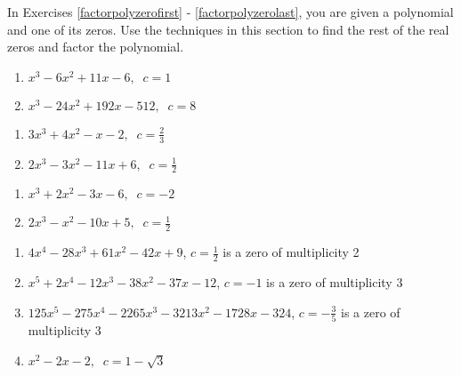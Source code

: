 \newpage

In Exercises \ref{factorpolyzerofirst} - \ref{factorpolyzerolast}, you are given a polynomial and one of its zeros.  Use the techniques in this section to find the rest of the real zeros and factor the polynomial.  

\begin{multicols}{2}
\begin{enumerate}
\setcounter{enumi}{\value{HW}}

\item $x^{3} - 6x^{2} + 11x - 6, \;\; c = 1$ \label{factorpolyzerofirst}
\item $x^{3} - 24x^{2} + 192x - 512, \;\; c = 8$

\setcounter{HW}{\value{enumi}}
\end{enumerate}
\end{multicols}

\begin{multicols}{2}
\begin{enumerate}
\setcounter{enumi}{\value{HW}}

\item $3x^{3} + 4x^{2} - x - 2, \;\; c = \frac{2}{3}$
\item $2x^3-3x^2-11x+6, \;\; c=\frac{1}{2}$

\setcounter{HW}{\value{enumi}}
\end{enumerate}
\end{multicols}

\begin{multicols}{2}
\begin{enumerate}
\setcounter{enumi}{\value{HW}}

\item $x^3+2x^2-3x-6, \;\; c = -2$
\item $2x^3-x^2-10x+5, \;\; c=\frac{1}{2}$

\setcounter{HW}{\value{enumi}}
\end{enumerate}
\end{multicols}


\begin{enumerate}
\setcounter{enumi}{\value{HW}}

\item $4x^{4} - 28x^{3} + 61x^{2} - 42x + 9$, $c = \frac{1}{2}$ is a zero of multiplicity 2 

\item  $x^5+2x^4-12x^3-38x^2-37x-12$, $c=-1$ is a zero of multiplicity 3

\item $125x^{5} - 275x^{4} - 2265x^{3} - 3213x^{2} - 1728x - 324$, $c = -\frac{3}{5}$ is a zero of multiplicity 3

\item $x^{2} - 2x - 2, \;\; c = 1 - \sqrt{3}$ \label{factorpolyzerolast}

\setcounter{HW}{\value{enumi}}
\end{enumerate}

